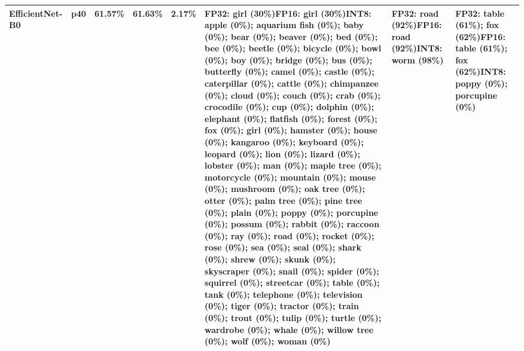 \begin{longtable}{p{2.8cm} r r r r p{5.0cm} p{4.2cm} p{4.2cm}}
EfficientNet-B0 & p40 & 61.57\% & 61.63\% & 2.17\% & FP32: girl (30\%)\newline FP16: girl (30\%)\newline INT8: apple (0\%); aquarium fish (0\%); baby (0\%); bear (0\%); beaver (0\%); bed (0\%); bee (0\%); beetle (0\%); bicycle (0\%); bowl (0\%); boy (0\%); bridge (0\%); bus (0\%); butterfly (0\%); camel (0\%); castle (0\%); caterpillar (0\%); cattle (0\%); chimpanzee (0\%); cloud (0\%); couch (0\%); crab (0\%); crocodile (0\%); cup (0\%); dolphin (0\%); elephant (0\%); flatfish (0\%); forest (0\%); fox (0\%); girl (0\%); hamster (0\%); house (0\%); kangaroo (0\%); keyboard (0\%); leopard (0\%); lion (0\%); lizard (0\%); lobster (0\%); man (0\%); maple tree (0\%); motorcycle (0\%); mountain (0\%); mouse (0\%); mushroom (0\%); oak tree (0\%); otter (0\%); palm tree (0\%); pine tree (0\%); plain (0\%); poppy (0\%); porcupine (0\%); possum (0\%); rabbit (0\%); raccoon (0\%); ray (0\%); road (0\%); rocket (0\%); rose (0\%); sea (0\%); seal (0\%); shark (0\%); shrew (0\%); skunk (0\%); skyscraper (0\%); snail (0\%); spider (0\%); squirrel (0\%); streetcar (0\%); table (0\%); tank (0\%); telephone (0\%); television (0\%); tiger (0\%); tractor (0\%); train (0\%); trout (0\%); tulip (0\%); turtle (0\%); wardrobe (0\%); whale (0\%); willow tree (0\%); wolf (0\%); woman (0\%) & FP32: road (92\%)\newline FP16: road (92\%)\newline INT8: worm (98\%) & FP32: table (61\%); fox (62\%)\newline FP16: table (61\%); fox (62\%)\newline INT8: poppy (0\%); porcupine (0\%) \\ \hline

\end{longtable}
